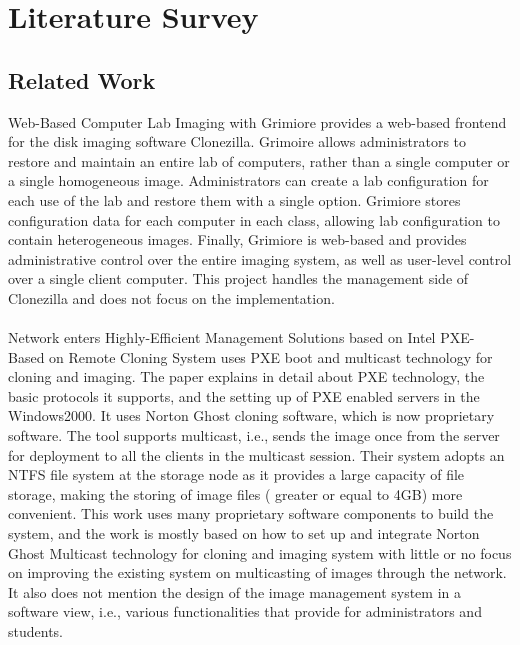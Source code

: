 \documentclass[a4paper,12pt]{article}
\begin{document}
\newpage
\section{\fontsize{16pt}{1em}  Literature Survey}


\subsection{ Related Work}

Web-Based Computer Lab Imaging with Grimiore \cite{Meek:2009:WBC:1629501.1629507} provides a web-based frontend for the disk imaging software Clonezilla. Grimoire allows administrators to restore and maintain an entire lab of computers, rather than a single computer or a single homogeneous image. Administrators can create a lab configuration for each use of the lab and restore them with a single option. Grimiore stores configuration data for each computer in each class, allowing lab configuration to contain heterogeneous images. Finally, Grimiore is web-based and provides administrative control over the entire imaging system, as well as user-level control over a single client computer.
This project handles the management side of Clonezilla and does not focus on the implementation.
\paragraph{}
Network enters Highly-Efficient Management Solutions based on Intel PXE-
Based on Remote Cloning System \cite{LiJinhui} uses PXE boot and multicast technology for cloning and imaging. The paper explains in detail about PXE technology, the basic protocols it supports, and the setting up of PXE enabled servers in the Windows2000.
It uses Norton Ghost cloning software, which is now proprietary software. The tool supports multicast, i.e., sends the image once from the server for deployment to all the clients in the multicast session. Their system adopts an NTFS file system at the storage node as it provides a large capacity of file storage, making the storing of image files ( greater or equal to 4GB) more convenient. This work uses many proprietary software components to build the system, and the work is mostly based on how to set up and integrate Norton Ghost Multicast technology for cloning and imaging system with little or no focus on improving the existing system on multicasting of images through the network. It also does not mention the design of the image management system in a software view, i.e., various functionalities that provide for administrators and students.
\end{document}
